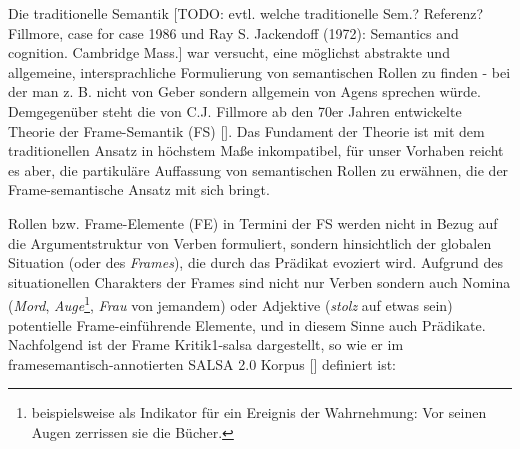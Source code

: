 \documentclass[12pt]{article}
\begin{document}
Die traditionelle Semantik [TODO: evtl. welche traditionelle Sem.? Referenz? Fillmore, case for case 1986 und Ray S. Jackendoff (1972): Semantics and cognition. Cambridge Mass.] war versucht, eine möglichst abstrakte und
allgemeine, intersprachliche Formulierung von semantischen Rollen zu
finden - bei der man z. B. nicht von \glqq{}Geber\grqq{} sondern allgemein
von \glqq{}Agens\grqq{} sprechen würde. Demgegenüber steht die von C.J. Fillmore
ab den 70er Jahren entwickelte Theorie der Frame-Semantik (FS)
[\cite{fillmore1985}]. Das Fundament der Theorie ist mit dem traditionellen
Ansatz in höchstem Maße inkompatibel, für unser Vorhaben reicht es aber, die
partikuläre Auffassung von semantischen Rollen zu erwähnen, die der
Frame-semantische Ansatz mit sich bringt.

Rollen bzw. Frame-Elemente (FE) in Termini der FS werden nicht in Bezug auf die
Argumentstruktur von Verben formuliert, sondern hinsichtlich der globalen
Situation (oder des \textit{Frames}), die durch das Prädikat evoziert wird. Aufgrund
des situationellen Charakters der Frames sind nicht nur Verben sondern auch
Nomina (\textit{Mord}, \textit{Auge}\footnote{beispielsweise als Indikator für ein Ereignis der Wahrnehmung: \glqq{}Vor seinen Augen zerrissen sie die Bücher.\grqq{}}, \textit{Frau} von jemandem) oder Adjektive (\textit{stolz} auf etwas sein) potentielle
Frame-einführende Elemente, und in diesem Sinne auch Prädikate. Nachfolgend ist der Frame \glqq{}Kritik1-salsa\grqq{} dargestellt, so wie er im framesemantisch-annotierten SALSA 2.0 Korpus [\cite{rehbein_adding_2012}] definiert ist:
\end{document}
